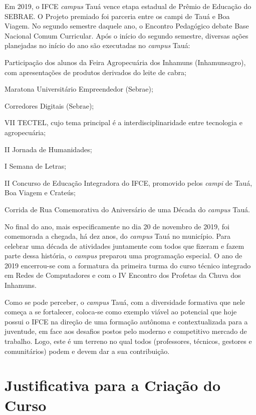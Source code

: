 \documentclass[
	12pt,				%
	openright,			%
	twoside,			%
	a4paper,			%
	chapter=TITLE,		%
	english,			%
	french,				%
	spanish,			%
	brazil,				%
	]{abntex2}
\begin{document}
Em 2019, o IFCE \textit{campus} Tauá vence etapa estadual de Prêmio de Educação do SEBRAE. O Projeto premiado foi parceria entre os campi de Tauá e Boa Viagem. No segundo semestre daquele ano, o Encontro Pedagógico debate Base Nacional Comum Curricular. Após o início do segundo semestre, diversas ações planejadas no início do ano são executadas no \textit{campus} Tauá:
\begin{alineas}
    \item Participação dos alunos da Feira Agropecuária dos Inhamuns (Inhamunsagro), com apresentações de produtos derivados do leite de cabra;
    \item Maratona Universitário Empreendedor (Sebrae);
    \item  Corredores Digitais (Sebrae);
    \item VII TECTEL, cujo tema principal é a interdisciplinaridade entre tecnologia e agropecuária;
    \item II Jornada de Humanidades;
    \item I Semana de Letras;
    \item II Concurso de Educação Integradora do IFCE, promovido pelos \textit{campi} de Tauá, Boa Viagem e Crateús;
    \item Corrida de Rua Comemorativa do Aniversário de uma Década do \textit{campus} Tauá.
\end{alineas}

No final do ano, mais especificamente no dia 20 de novembro de 2019, foi comemorada a chegada, há dez anos, do  \textit{campus} Tauá no município.  Para celebrar uma década de atividades juntamente com todos que fizeram e fazem parte dessa história, o \textit{campus} preparou uma programação especial. O ano de 2019  encerrou-se com a formatura da primeira turma do curso técnico integrado em Redes de Computadores e com o  IV Encontro dos Profetas da Chuva dos Inhamuns.


Como se pode perceber, o \textit{campus} Tauá, com a diversidade formativa que nele começa a se fortalecer, coloca-se como exemplo viável ao potencial que hoje possui o IFCE na direção de uma formação autônoma e contextualizada para a juventude, em face aos desafios postos pelo moderno e competitivo mercado de trabalho. Logo, este é um terreno no qual todos (professores, técnicos, gestores e comunitários) podem e devem dar a sua contribuição.



\chapter{Justificativa para a Criação do Curso}
\end{document}
